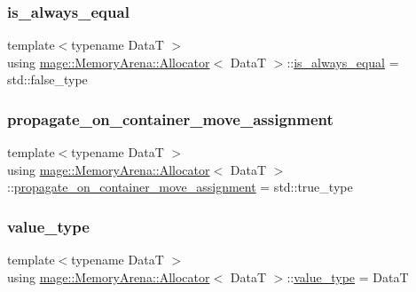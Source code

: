 \subsubsection{\texorpdfstring{is\+\_\+always\+\_\+equal}{is\_always\_equal}}
{\footnotesize\ttfamily template$<$typename DataT $>$ \\
using \hyperlink{structmage_1_1_memory_arena_1_1_allocator}{mage\+::\+Memory\+Arena\+::\+Allocator}$<$ DataT $>$\+::\hyperlink{structmage_1_1_memory_arena_1_1_allocator_aa03d66542fcf507199911bca8b270bfc}{is\+\_\+always\+\_\+equal} =  std\+::false\+\_\+type}

\hypertarget{structmage_1_1_memory_arena_1_1_allocator_adeee02145ab4a2eca5e38a70babd81e0}{}\label{structmage_1_1_memory_arena_1_1_allocator_adeee02145ab4a2eca5e38a70babd81e0} 
\subsubsection{\texorpdfstring{propagate\+\_\+on\+\_\+container\+\_\+move\+\_\+assignment}{propagate\_on\_container\_move\_assignment}}
{\footnotesize\ttfamily template$<$typename DataT $>$ \\
using \hyperlink{structmage_1_1_memory_arena_1_1_allocator}{mage\+::\+Memory\+Arena\+::\+Allocator}$<$ DataT $>$\+::\hyperlink{structmage_1_1_memory_arena_1_1_allocator_adeee02145ab4a2eca5e38a70babd81e0}{propagate\+\_\+on\+\_\+container\+\_\+move\+\_\+assignment} =  std\+::true\+\_\+type}

\hypertarget{structmage_1_1_memory_arena_1_1_allocator_a6ae3ef840bd738889b2c4136294a4f6d}{}\label{structmage_1_1_memory_arena_1_1_allocator_a6ae3ef840bd738889b2c4136294a4f6d} 
\subsubsection{\texorpdfstring{value\+\_\+type}{value\_type}}
{\footnotesize\ttfamily template$<$typename DataT $>$ \\
using \hyperlink{structmage_1_1_memory_arena_1_1_allocator}{mage\+::\+Memory\+Arena\+::\+Allocator}$<$ DataT $>$\+::\hyperlink{structmage_1_1_memory_arena_1_1_allocator_a6ae3ef840bd738889b2c4136294a4f6d}{value\+\_\+type} =  DataT}

